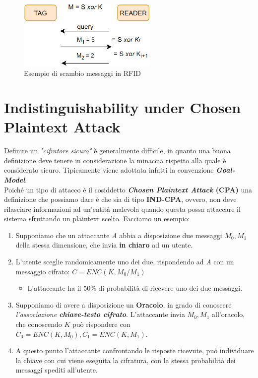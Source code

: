\begin{figure}[h]
    \centering
    \includegraphics[width=0.6\textwidth]{image/rfid_example.png}
    \caption{Esempio di scambio messaggi in RFID}
    \label{fig:rfid_example}
\end{figure}
\section{Indistinguishability under Chosen Plaintext Attack}
Definire un \emph{"cifratore sicuro"} è generalmente difficile, in quanto una buona definizione deve tenere in considerazione la minaccia rispetto alla quale è considerato sicuro. Tipicamente viene adottata infatti la convenzione \textit{\textbf{Goal-Model}}.\\
Poiché un tipo di attacco è il cosiddetto \textbf{\textit{Chosen Plaintext Attack} (CPA)} una definizione che possiamo dare è che sia di tipo \textbf{IND-CPA}, ovvero, non deve rilasciare informazioni ad un'entità malevola quando questa possa attaccare il sistema sfruttando un plaintext scelto. Facciamo un esempio:
\begin{enumerate}
    \item Supponiamo che un attaccante \textit{A} abbia a disposizione due messaggi $M_0,M_1$ della stessa dimensione, che invia \textbf{in chiaro} ad un utente.
    \item L'utente sceglie randomicamente uno dei due, rispondendo ad \textit{A} con un messaggio cifrato: $C=ENC(K,M_0/M_1)$
    \begin{itemize}
        \item L'attaccante ha il $50\%$ di probabilità di ricevere uno dei due messaggi.
    \end{itemize}
    \item Supponiamo di avere a disposizione un \textbf{Oracolo}, in grado di conoscere \textit{l'associazione \textbf{chiave-testo cifrato}}. L'attaccante invia $M_0,M_1$ all'oracolo, che conoscendo $K$ può rispondere con $C_0=ENC(K,M_0),C_1=ENC(K,M_1)$.
    \item A questo punto l'attaccante confrontando le risposte ricevute, può individuare la chiave con cui viene eseguita la cifratura, con la stessa probabilità dei messaggi spediti all'utente.
\end{enumerate}
